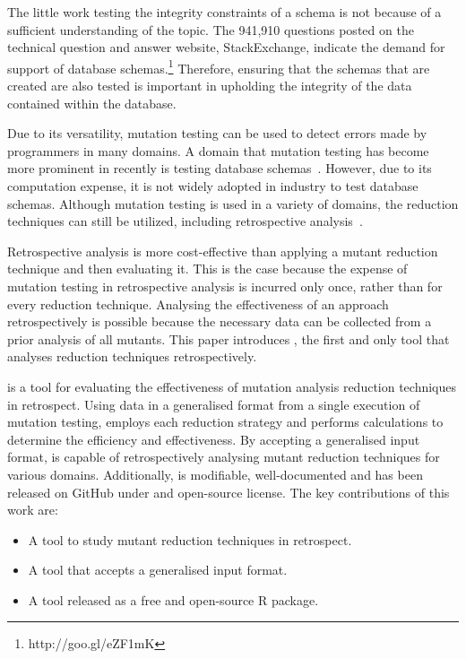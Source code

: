 

The little work testing the integrity constraints of a schema is not
because of a sufficient understanding of the topic. The 941,910 questions posted on
the technical question and answer website, StackExchange, indicate the demand for support
of database schemas.\footnote{http://goo.gl/eZF1mK} Therefore, ensuring that
the schemas that are created are also tested is important in upholding the integrity
of the data contained within the database.

Due to its versatility, mutation testing can be used to detect errors made by programmers in many domains.
A domain that mutation testing has become more prominent in recently is testing database
schemas~\cite{mcminn2016virtual, mcminn2015effectiveness, wright2013efficient}. However,
due to its computation expense, it is not widely adopted in industry to test database schemas.
Although mutation testing is used in a variety of domains, the reduction techniques can still
be utilized, including retrospective analysis~\cite{jia2011analysis, wong1995reducing, offutt1993experimental, offutt2001mutation}.

Retrospective analysis is more cost-effective than applying a
mutant reduction technique and then evaluating it.
This is the case because the expense of mutation testing in
retrospective analysis is incurred only once, rather than for
every reduction technique. Analysing the effectiveness of an approach retrospectively
is possible because the necessary data can be collected from a prior analysis of all mutants.
This paper introduces \mr, the first and only tool that analyses reduction techniques retrospectively.

\mr is a tool for evaluating the effectiveness of mutation analysis reduction techniques
in retrospect. Using data in a generalised format from a single execution of mutation testing, \mr
employs each reduction strategy and performs calculations to determine the efficiency and
effectiveness. By accepting a generalised input format, \mr is capable of
retrospectively analysing mutant reduction techniques for various domains.
Additionally, \mr is modifiable, well-documented and has been released on
GitHub under and open-source license. The key contributions of this work are:

    \begin{itemize}
        \item A tool to study mutant reduction techniques in retrospect.
        \item A tool that accepts a generalised input format.
        \item A tool released as a free and open-source R package.
    \end{itemize}
